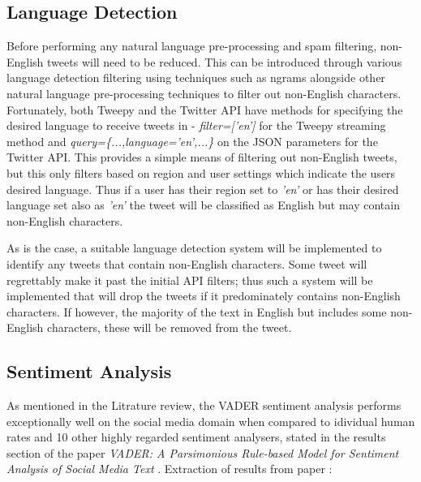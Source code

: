 \documentclass[oneside, 12pt]{article}
\begin{document}
		
		\subsection{Language Detection}
		Before performing any natural language pre-processing and spam filtering, non-English tweets will need to be reduced. This can be introduced through various language detection filtering using techniques such as ngrams alongside other natural language pre-processing techniques to filter out non-English characters. Fortunately, both Tweepy and the Twitter API have methods for specifying the desired language to receive tweets in - \textit{filter=['en']} for the Tweepy streaming method and \textit{query=\{...,language='en',...\}} on the JSON parameters for the Twitter API. This provides a simple means of filtering out non-English tweets, but this only filters based on region and user settings which indicate the users desired language. Thus if a user has their region set to \textit{'en'} or has their desired language set also as \textit{'en'} the tweet will be classified as English but may contain non-English characters. 
		
		As is the case, a suitable language detection system will be implemented to identify any tweets that contain non-English characters. Some tweet will regrettably make it past the initial API filters; thus such a system will be implemented that will drop the tweets if it predominately contains non-English characters. If however, the majority of the text in English but includes some non-English characters, these will be removed from the tweet.
		
		\subsection{Sentiment Analysis}
		As mentioned in the Litrature review, the VADER sentiment analysis performs exceptionally well on the social media domain when compared to idividual human rates and 10 other highly regarded sentiment analysers, stated in the results section of the paper \textit{VADER: A Parsimonious Rule-based Model for Sentiment Analysis of Social Media Text} \cite{12}. \newline Extraction of results from paper \cite{12}:
\end{document}
